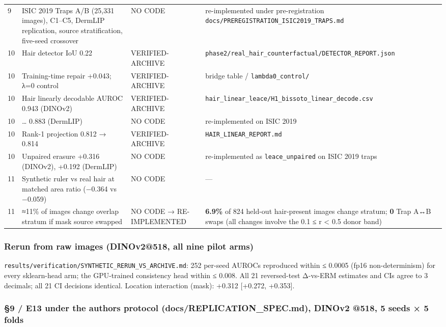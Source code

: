 {{\begin{longtable}[]{@{}llll@{}}
9 & ISIC 2019 Traps A/B (25,331 images), C1--C5, DermLIP replication, source stratification, five-seed crossover & NO CODE & re-implemented under pre-registration \texttt{docs/PREREGISTRATION\_ISIC2019\_TRAPS.md} \\
10 & Hair detector IoU 0.22 & VERIFIED-ARCHIVE & \texttt{phase2/real\_hair\_counterfactual/DETECTOR\_REPORT.json} \\
10 & Training-time repair +0.043; λ=0 control & VERIFIED-ARCHIVE & bridge table / \texttt{lambda0\_control/} \\
10 & Hair linearly decodable AUROC 0.943 (DINOv2) & VERIFIED-ARCHIVE & \texttt{hair\_linear\_leace/H1\_bissoto\_linear\_decode.csv} \\
10 & \ldots{} 0.883 (DermLIP) & NO CODE & re-implemented on ISIC 2019 \\
10 & Rank-1 projection 0.812 → 0.814 & VERIFIED-ARCHIVE & \texttt{HAIR\_LINEAR\_REPORT.md} \\
10 & Unpaired erasure +0.316 (DINOv2), +0.192 (DermLIP) & NO CODE & re-implemented as \texttt{leace\_unpaired} on ISIC 2019 traps \\
11 & Synthetic ruler vs real hair at matched area ratio (−0.364 vs −0.059) & NO CODE & --- \\
11 & ≈11\% of images change overlap stratum if mask source swapped & NO CODE → RE-IMPLEMENTED & \textbf{6.9\%} of 824 held-out hair-present images change stratum; \textbf{0} Trap A↔B swaps (all changes involve the 0.1 ≤ r \textless{} 0.5 donor band) \\
\end{longtable}
}

\subsubsection{Rerun from raw images (DINOv2@518, all nine pilot arms)}\label{rerun-from-raw-images-dinov2518-all-nine-pilot-arms}

\texttt{results/verification/SYNTHETIC\_RERUN\_VS\_ARCHIVE.md}: 252 per-seed AUROCs reproduced within ≤ 0.0005
(fp16 non-determinism) for every sklearn-head arm; the GPU-trained consistency head within ≤ 0.008.
All 21 reversed-test Δ-vs-ERM estimates and CIs agree to 3 decimals; all 21 CI decisions identical.
Location interaction (mask): +0.312 {[}+0.272, +0.353{]}.

\subsubsection{§9 / E13 under the author\textquotesingle s protocol (docs/REPLICATION\_SPEC.md), DINOv2 @518, 5 seeds × 5 folds}\label{9--e13-under-the-authors-protocol-docsreplication_specmd-dinov2-518-5-seeds--5-folds}

}
